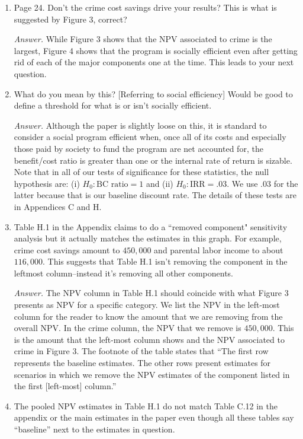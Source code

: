 \begin{enumerate}
\item Page 24. Don't the crime cost savings drive your results? This is what is suggested by Figure 3, correct?

\noindent \textit{Answer.} While Figure 3 shows that the NPV associated to crime is the largest, Figure 4 shows that the program is socially efficient even after getting rid of each of the major components one at the time. This leads to your next question. 

\item What do you mean by this? [Referring to social efficiency] Would be good to define a threshold for what is or isn't socially efficient.

\noindent \textit{Answer.} Although the paper is slightly loose on this, it is standard to consider a social program efficient when, once all of its costs and especially those paid by society to fund the program are net accounted for, the benefit/cost ratio is greater than one or the internal rate of return is sizable. Note that in all of our tests of significance for these statistics, the null hypothesis are: (i) $H_0: \text{BC ratio} = 1$  and (ii) $H_0: \text{IRR} = .03$. We use $.03$ for the latter because that is our baseline discount rate. The details of these tests are in Appendices C and H.

\item Table H.1 in the Appendix claims to do a ``removed component" sensitivity analysis but it actually matches the estimates in this graph. For example, crime cost savings amount to $450,000$ and parental labor income to about $116,000$. This suggests that Table H.1 isn't removing the component in the leftmost column--instead it's removing all other components. 

\noindent \textit{Answer.} The NPV column in Table H.1 should coincide with what Figure 3 presents as NPV for a specific category. We list the NPV in the left-most column for the reader to know the amount that we are removing from the overall NPV. In the crime column, the NPV that we remove is $450,000$. This is the amount that the left-most column shows and the NPV associated to crime in Figure 3. The footnote of the table states that ``The first row represents the baseline estimates. The other rows present estimates for scenarios in which we remove the NPV estimates of the component listed in the first [left-most] column.''

\item The pooled NPV estimates in Table H.1 do not match Table C.12 in the appendix or the main estimates in the paper even though all these tables say ``baseline'' next to the estimates in question.


\end{enumerate}
